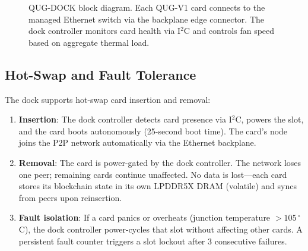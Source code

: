 \documentclass[11pt,a4paper]{article}
\begin{document}
\begin{figure}[H]
\caption{QUG-DOCK block diagram. Each QUG-V1 card connects to the managed Ethernet switch via the backplane edge connector. The dock controller monitors card health via I$^2$C and controls fan speed based on aggregate thermal load.}
\label{fig:dock_block}
\end{figure}

\subsection{Hot-Swap and Fault Tolerance}

The dock supports hot-swap card insertion and removal:

\begin{enumerate}
    \item \textbf{Insertion}: The dock controller detects card presence via I$^2$C, powers the slot, and the card boots autonomously (25-second boot time). The card's node joins the P2P network automatically via the Ethernet backplane.
    \item \textbf{Removal}: The card is power-gated by the dock controller. The network loses one peer; remaining cards continue unaffected. No data is lost---each card stores its blockchain state in its own LPDDR5X DRAM (volatile) and syncs from peers upon reinsertion.
    \item \textbf{Fault isolation}: If a card panics or overheats (junction temperature $> 105\,^\circ$C), the dock controller power-cycles that slot without affecting other cards. A persistent fault counter triggers a slot lockout after 3 consecutive failures.
\end{enumerate}
\end{document}
